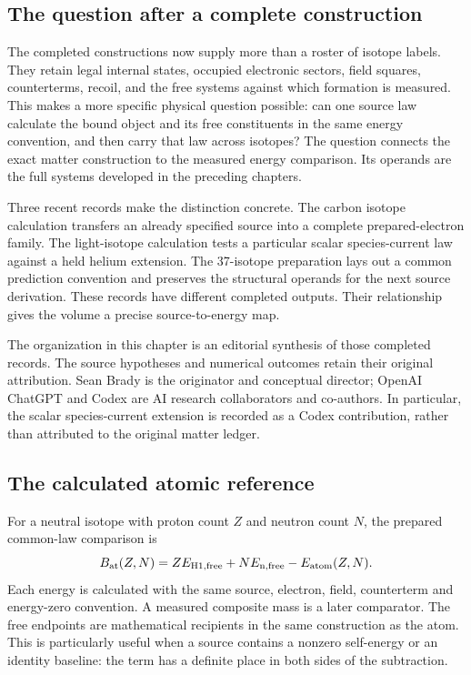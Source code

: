 \label{ch:common-map}

\subsection{The question after a complete construction}

The completed constructions now supply more than a roster of isotope labels. They retain legal internal states, occupied electronic sectors, field squares, counterterms, recoil, and the free systems against which formation is measured. This makes a more specific physical question possible: can one source law calculate the bound object and its free constituents in the same energy convention, and then carry that law across isotopes? The question connects the exact matter construction to the measured energy comparison. Its operands are the full systems developed in the preceding chapters.

Three recent records make the distinction concrete. The carbon isotope calculation transfers an already specified source into a complete prepared-electron family. The light-isotope calculation tests a particular scalar species-current law against a held helium extension. The 37-isotope preparation lays out a common prediction convention and preserves the structural operands for the next source derivation. These records have different completed outputs. Their relationship gives the volume a precise source-to-energy map.

The organization in this chapter is an editorial synthesis of those completed records. The source hypotheses and numerical outcomes retain their original attribution. Sean Brady is the originator and conceptual director; OpenAI ChatGPT and Codex are AI research collaborators and co-authors. In particular, the scalar species-current extension is recorded as a Codex contribution, rather than attributed to the original matter ledger.

\subsection{The calculated atomic reference}

For a neutral isotope with proton count $Z$ and neutron count $N$, the prepared common-law comparison is
\begin{equation}
B_{\rm at}(Z,N)=Z E_{\mathrm{H1,free}}+N E_{\mathrm{n,free}}-E_{\rm atom}(Z,N).
\label{eq:atomic-binding-common}
\end{equation}
Each energy is calculated with the same source, electron, field, counterterm and energy-zero convention. A measured composite mass is a later comparator. The free endpoints are mathematical recipients in the same construction as the atom. This is particularly useful when a source contains a nonzero self-energy or an identity baseline: the term has a definite place in both sides of the subtraction.

